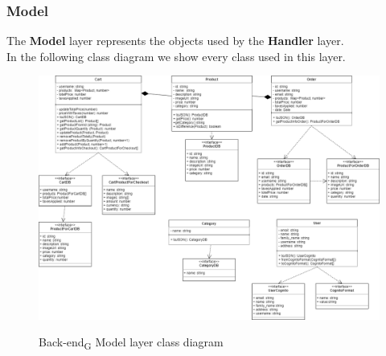 \subsubsection{Model}
The \textbf{Model} layer represents the objects used by the \textbf{Handler} layer. \\
In the following class diagram we show every class used in this layer.

\begin{figure}[H]
\centering
\includegraphics[scale=0.40]{res/Architettura/Backend/img/diagrammaClassiBack-end}\\
\caption{Back-end\textsubscript{G} Model layer class diagram}
\end{figure}


